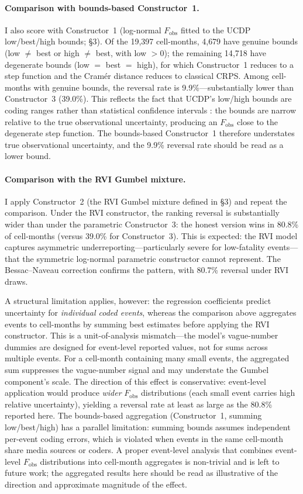 \paragraph{Comparison with bounds-based Constructor~1.}
I also score with Constructor~1 (log-normal $F_\text{obs}$ fitted to the UCDP low/best/high bounds; \S3). Of the 19{,}397 cell-months, 4{,}679 have genuine bounds (low $\neq$ best or high $\neq$ best, with low $> 0$); the remaining 14{,}718 have degenerate bounds (low $=$ best $=$ high), for which Constructor~1 reduces to a step function and the Cram\'er distance reduces to classical CRPS. Among cell-months with genuine bounds, the reversal rate is 9.9\%---substantially lower than Constructor~3 (39.0\%). This reflects the fact that UCDP's low/high bounds are coding ranges rather than statistical confidence intervals \citep{vesco2026uncertainty}: the bounds are narrow relative to the true observational uncertainty, producing an $F_\text{obs}$ close to the degenerate step function. The bounds-based Constructor~1 therefore understates true observational uncertainty, and the 9.9\% reversal rate should be read as a lower bound.

\paragraph{Comparison with the RVI Gumbel mixture.}
I apply Constructor~2 (the RVI Gumbel mixture defined in \S3) and repeat the comparison. Under the RVI constructor, the ranking reversal is substantially wider than under the parametric Constructor~3: the honest version wins in 80.8\% of cell-months (versus 39.0\% for Constructor~3). This is expected: the RVI model captures asymmetric underreporting---particularly severe for low-fatality events---that the symmetric log-normal parametric constructor cannot represent. The Bessac--Naveau correction confirms the pattern, with 80.7\% reversal under RVI draws.

A structural limitation applies, however: the \citet{vesco2026uncertainty} regression coefficients predict uncertainty for \emph{individual coded events}, whereas the comparison above aggregates events to cell-months by summing best estimates before applying the RVI constructor. This is a unit-of-analysis mismatch---the model's vague-number dummies are designed for event-level reported values, not for sums across multiple events. For a cell-month containing many small events, the aggregated sum suppresses the vague-number signal and may understate the Gumbel component's scale. The direction of this effect is conservative: event-level application would produce \emph{wider} $F_\text{obs}$ distributions (each small event carries high relative uncertainty), yielding a reversal rate at least as large as the 80.8\% reported here. The bounds-based aggregation (Constructor~1, summing low/best/high) has a parallel limitation: summing bounds assumes independent per-event coding errors, which is violated when events in the same cell-month share media sources or coders. A proper event-level analysis that combines event-level $F_\text{obs}$ distributions into cell-month aggregates is non-trivial and is left to future work; the aggregated results here should be read as illustrative of the direction and approximate magnitude of the effect.

